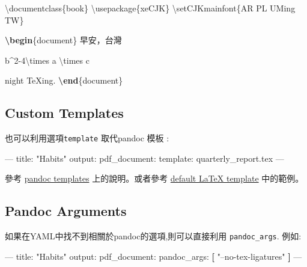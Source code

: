 \documentclass[]{book}
\newenvironment{Shaded}{\begin{snugshade}}{\end{snugshade}}
\newcommand{\AttributeTok}[1]{\textcolor[rgb]{0.77,0.63,0.00}{#1}}
\newcommand{\BuiltInTok}[1]{#1}
\newcommand{\ExtensionTok}[1]{#1}
\newcommand{\FunctionTok}[1]{\textcolor[rgb]{0.00,0.00,0.00}{#1}}
\newcommand{\KeywordTok}[1]{\textcolor[rgb]{0.13,0.29,0.53}{\textbf{#1}}}
\newcommand{\NormalTok}[1]{#1}
\newcommand{\OtherTok}[1]{\textcolor[rgb]{0.56,0.35,0.01}{#1}}
\newcommand{\SpecialCharTok}[1]{\textcolor[rgb]{0.00,0.00,0.00}{#1}}
\newcommand{\SpecialStringTok}[1]{\textcolor[rgb]{0.31,0.60,0.02}{#1}}
\newcommand{\StringTok}[1]{\textcolor[rgb]{0.31,0.60,0.02}{#1}}
\theoremstyle{definition}
\theoremstyle{definition}
\theoremstyle{definition}
\theoremstyle{remark}
\begin{document}
\begin{Shaded}
\begin{Highlighting}[]
\BuiltInTok{\textbackslash{}documentclass}\NormalTok{\{}\ExtensionTok{book}\NormalTok{\}}
\BuiltInTok{\textbackslash{}usepackage}\NormalTok{\{}\ExtensionTok{xeCJK}\NormalTok{\}}
\FunctionTok{\textbackslash{}setCJKmainfont}\NormalTok{\{AR PL UMing TW\}}


\KeywordTok{\textbackslash{}begin}\NormalTok{\{}\ExtensionTok{document}\NormalTok{\}}
\NormalTok{早安，台灣}

\SpecialStringTok{$$b^2-4}\SpecialCharTok{\textbackslash{}times}\SpecialStringTok{ a }\SpecialCharTok{\textbackslash{}times}\SpecialStringTok{ c$$}

\NormalTok{night TeXing.}
\KeywordTok{\textbackslash{}end}\NormalTok{\{}\ExtensionTok{document}\NormalTok{\}}
\end{Highlighting}
\end{Shaded}

\hypertarget{custom-templates}{%
\subsection{Custom Templates}\label{custom-templates}}

也可以利用選項\texttt{template} 取代pandoc 模板 :

\begin{Shaded}
\begin{Highlighting}[]
\OtherTok{---}
\FunctionTok{title:}\AttributeTok{ }\StringTok{"Habits"}
\FunctionTok{output:}
  \FunctionTok{pdf_document:}
    \FunctionTok{template:}\AttributeTok{ quarterly_report.tex}
\OtherTok{---}
\end{Highlighting}
\end{Shaded}

參考 \href{http://pandoc.org/README.html\#templates}{pandoc templates}
上的說明。或者參考
\href{https://github.com/jgm/pandoc-templates/blob/master/default.latex}{default
LaTeX template} 中的範例。

\hypertarget{pandoc-arguments}{%
\subsection{Pandoc Arguments}\label{pandoc-arguments}}

如果在YAML中找不到相關於pandoc的選項,則可以直接利用
\texttt{pandoc\_args}. 例如:

\begin{Shaded}
\begin{Highlighting}[]
\OtherTok{---}
\FunctionTok{title:}\AttributeTok{ }\StringTok{"Habits"}
\FunctionTok{output:}
  \FunctionTok{pdf_document:}
    \FunctionTok{pandoc_args:}\AttributeTok{ }\KeywordTok{[}
      \StringTok{"--no-tex-ligatures"}
    \KeywordTok{]}
\OtherTok{---}
\end{Highlighting}
\end{Shaded}
\end{document}
